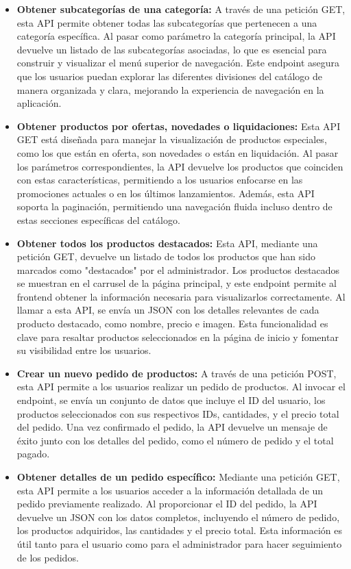 \begin{itemize}
    \item \textbf{Obtener subcategorías de una categoría:} A través de una petición GET, esta API permite obtener todas las subcategorías que pertenecen a una categoría específica. Al pasar como parámetro la categoría principal, la API devuelve un listado de las subcategorías asociadas, lo que es esencial para construir y visualizar el menú superior de navegación. Este endpoint asegura que los usuarios puedan explorar las diferentes divisiones del catálogo de manera organizada y clara, mejorando la experiencia de navegación en la aplicación.

    \item \textbf{Obtener productos por ofertas, novedades o liquidaciones:} Esta API GET está diseñada para manejar la visualización de productos especiales, como los que están en oferta, son novedades o están en liquidación. Al pasar los parámetros correspondientes, la API devuelve los productos que coinciden con estas características, permitiendo a los usuarios enfocarse en las promociones actuales o en los últimos lanzamientos. Además, esta API soporta la paginación, permitiendo una navegación fluida incluso dentro de estas secciones específicas del catálogo.

    \item \textbf{Obtener todos los productos destacados:} Esta API, mediante una petición GET, devuelve un listado de todos los productos que han sido marcados como "destacados" por el administrador. Los productos destacados se muestran en el carrusel de la página principal, y este endpoint permite al frontend obtener la información necesaria para visualizarlos correctamente. Al llamar a esta API, se envía un JSON con los detalles relevantes de cada producto destacado, como nombre, precio e imagen. Esta funcionalidad es clave para resaltar productos seleccionados en la página de inicio y fomentar su visibilidad entre los usuarios.

    \item \textbf{Crear un nuevo pedido de productos:} A través de una petición POST, esta API permite a los usuarios realizar un pedido de productos. Al invocar el endpoint, se envía un conjunto de datos que incluye el ID del usuario, los productos seleccionados con sus respectivos IDs, cantidades, y el precio total del pedido. Una vez confirmado el pedido, la API devuelve un mensaje de éxito junto con los detalles del pedido, como el número de pedido y el total pagado.
    
    \item \textbf{Obtener detalles de un pedido específico:} Mediante una petición GET, esta API permite a los usuarios acceder a la información detallada de un pedido previamente realizado. Al proporcionar el ID del pedido, la API devuelve un JSON con los datos completos, incluyendo el número de pedido, los productos adquiridos, las cantidades y el precio total. Esta información es útil tanto para el usuario como para el administrador para hacer seguimiento de los pedidos.

    
\end{itemize}

